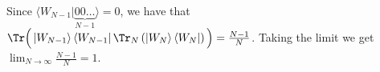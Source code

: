 \begin{exercises}
\begin{enumerate}
	Since $\langle W_{N-1}|\underbrace{00\ldots}_{N-1}\rangle = 0$, we have that $\Tr\Big(\left| W_{N-1} \right\rangle \left\langle W_{N-1} \right| \Tr_N\left(\left| W_N \right\rangle \left\langle W_N \right|\right)\Big) = \frac{N-1}{N}$. Taking the limit we get $\lim_{N\rightarrow\infty}\frac{N-1}{N} = 1$.
\end{enumerate}
\end{exercises}